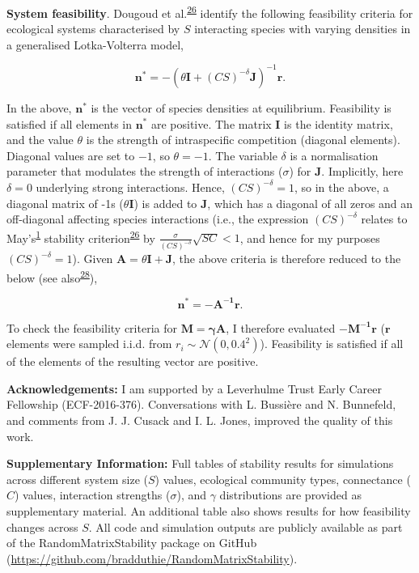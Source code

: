 \documentclass[]{article}
\begin{document}
\textbf{System feasibility}. Dougoud et
al.\textsuperscript{\protect\hyperlink{ref-Dougoud2018}{26}} identify
the following feasibility criteria for ecological systems characterised
by \(S\) interacting species with varying densities in a generalised
Lotka-Volterra model,

\[\mathbf{n^{*}} = -\left(\theta \mathbf{I} + (CS)^{-\delta}\mathbf{J} \right)^{-1}\mathbf{r}.\]

In the above, \(\mathbf{n^{*}}\) is the vector of species densities at
equilibrium. Feasibility is satisfied if all elements in
\(\mathbf{n^{*}}\) are positive. The matrix \(\mathbf{I}\) is the
identity matrix, and the value \(\theta\) is the strength of
intraspecific competition (diagonal elements). Diagonal values are set
to \(-1\), so \(\theta = -1\). The variable \(\delta\) is a
normalisation parameter that modulates the strength of interactions
(\(\sigma\)) for \(\mathbf{J}\). Implicitly, here \(\delta = 0\)
underlying strong interactions. Hence, \((CS)^{-\delta} = 1\), so in the
above, a diagonal matrix of -1s (\(\theta \mathbf{I}\)) is added to
\(\mathbf{J}\), which has a diagonal of all zeros and an off-diagonal
affecting species interactions (i.e., the expression \((CS)^{-\delta}\)
relates to May's\textsuperscript{\protect\hyperlink{ref-May1972}{1}}
stability
criterion\textsuperscript{\protect\hyperlink{ref-Dougoud2018}{26}} by
\(\frac{\sigma}{(CS)^{-\delta}}\sqrt{SC} < 1\), and hence for my
purposes \((CS)^{-\delta} = 1\)). Given
\(\mathbf{A} = \theta\mathbf{I + J}\), the above criteria is therefore
reduced to the below (see
also\textsuperscript{\protect\hyperlink{ref-Servan2018}{28}}),

\[\mathbf{n^{*} = -A^{-1}r}.\]

To check the feasibility criteria for \(\mathbf{M = \gamma A}\), I
therefore evaluated \(\mathbf{-M^{-1}r}\) (\(\mathbf{r}\) elements were
sampled i.i.d. from \(r_{i} \sim \mathcal{N}(0, 0.4^{2})\)). Feasibility
is satisfied if all of the elements of the resulting vector are
positive.

\textbf{Acknowledgements:} I am supported by a Leverhulme Trust Early
Career Fellowship (ECF-2016-376). Conversations with L. Bussière and N.
Bunnefeld, and comments from J. J. Cusack and I. L. Jones, improved the
quality of this work.

\textbf{Supplementary Information:} Full tables of stability results for
simulations across different system size (\(S\)) values, ecological
community types, connectance (\(C\)) values, interaction strengths
(\(\sigma\)), and \(\gamma\) distributions are provided as supplementary
material. An additional table also shows results for how feasibility
changes across \(S\). All code and simulation outputs are publicly
available as part of the RandomMatrixStability package on GitHub
(\url{https://github.com/bradduthie/RandomMatrixStability}).
\end{document}
